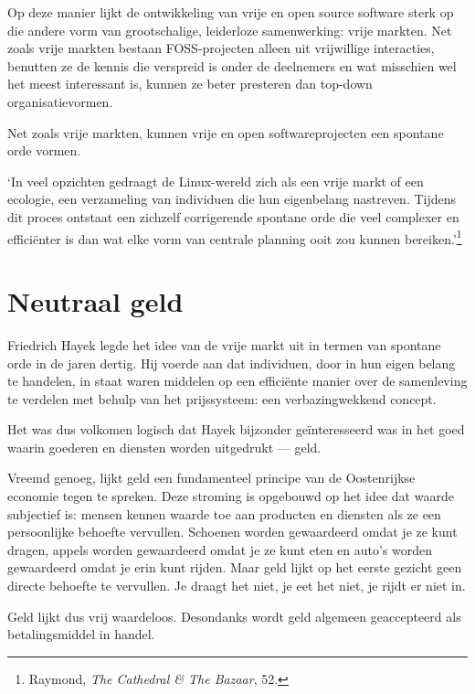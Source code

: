 \documentclass[
  a5paper,
  smalldemyvopaper,11pt,twoside,onecolumn,openright,extrafontsizes,
hidelinks]{memoir}
\renewenvironment{quote}%
               {\list{}{\rightmargin=.3cm\leftmargin=.3cm}%
                \itshape \item[]}%
               {\endlist}
\begin{document}
Op deze manier lijkt de ontwikkeling van vrije en open source software
sterk op die andere vorm van grootschalige, leiderloze samenwerking:
vrije markten. Net zoals vrije markten bestaan FOSS-projecten alleen uit
vrijwillige interacties, benutten ze de kennis die verspreid is onder de
deelnemers en wat misschien wel het meest interessant is, kunnen ze
beter presteren dan top-down organisatievormen.

Net zoals vrije markten, kunnen vrije en open softwareprojecten een
spontane orde vormen.

\begin{quote}
`In veel opzichten gedraagt de Linux-wereld zich als een vrije markt of
een ecologie, een verzameling van individuen die hun eigenbelang
nastreven. Tijdens dit proces ontstaat een zichzelf corrigerende
spontane orde die veel complexer en efficiënter is dan wat elke vorm van
centrale planning ooit zou kunnen bereiken.'\footnote{\hspace{0pt}Raymond,
  \emph{The Cathedral \& The Bazaar}, 52.}
\end{quote}

\chapter{Neutraal geld}\label{neutraal-geld}

Friedrich Hayek legde het idee van de vrije markt uit in termen van
spontane orde in de jaren dertig. Hij voerde aan dat individuen, door in
hun eigen belang te handelen, in staat waren middelen op een efficiënte
manier over de samenleving te verdelen met behulp van het prijssysteem:
een verbazingwekkend concept.

Het was dus volkomen logisch dat Hayek bijzonder geïnteresseerd was in
het goed waarin goederen en diensten worden uitgedrukt --- geld.

Vreemd genoeg, lijkt geld een fundamenteel principe van de Oostenrijkse
economie tegen te spreken. Deze stroming is opgebouwd op het idee dat
waarde subjectief is: mensen kennen waarde toe aan producten en diensten
als ze een persoonlijke behoefte vervullen. Schoenen worden gewaardeerd
omdat je ze kunt dragen, appels worden gewaardeerd omdat je ze kunt eten
en auto's worden gewaardeerd omdat je erin kunt rijden. Maar geld lijkt
op het eerste gezicht geen directe behoefte te vervullen. Je draagt het
niet, je eet het niet, je rijdt er niet in.

Geld lijkt dus vrij waardeloos. Desondanks wordt geld algemeen
geaccepteerd als betalingsmiddel in handel.
\end{document}
